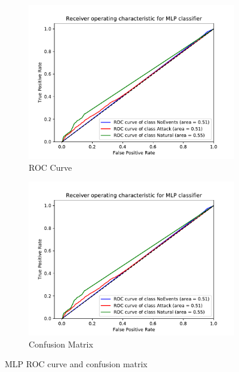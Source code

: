 \begin{figure}[H]
    \begin{subfigure}[t]{0.45\textwidth}
        \centering
        \includegraphics[page=1, width=\linewidth]{images/results_scikit/MLP}
        \caption{ROC Curve}
        \label{fig:scikit_MLP_ROC}
    \end{subfigure}
    \begin{subfigure}[t]{0.45\textwidth}
        \centering
        \includegraphics[page=2, width=\linewidth, trim= 0 50 0 100, clip]{images/results_scikit/MLP}
        \caption{Confusion Matrix}
        \label{fig:scikit_MLP_CM}
    \end{subfigure}
    \caption{MLP ROC curve and confusion matrix}
    \label{fig:ROCCM_MLP}
\end{figure}

